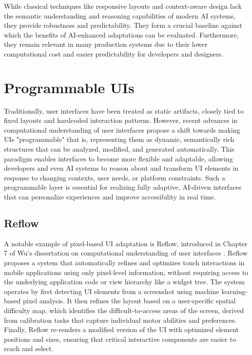 \documentclass[openany]{book}
\begin{document}
While classical techniques like responsive layouts and context-aware design lack the semantic understanding and reasoning capabilities of modern AI systems, they provide robustness and predictability. They form a crucial baseline against which the benefits of AI-enhanced adaptations can be evaluated. Furthermore, they remain relevant in many production systems due to their lower computational cost and easier predictability for developers and designers.

\section{Programmable UIs}
Traditionally, user interfaces have been treated as static artifacts, closely tied to fixed layouts and hardcoded interaction patterns. However, recent advances in computational understanding of user interfaces propose a shift towards making UIs "programmable" that is, representing them as dynamic, semantically rich structures that can be analyzed, modified, and generated automatically. This paradigm enables interfaces to become more flexible and adaptable, allowing developers and even AI systems to reason about and transform UI elements in response to changing contexts, user needs, or platform constraints. Such a programmable layer is essential for realizing fully adaptive, AI-driven interfaces that can personalize experiences and improve accessibility in real time.

\subsection{Reflow}
 
A notable example of pixel-based UI adaptation is Reflow, introduced in Chapter 7 of Wu's dissertation on computational understanding of user interfaces \cite{Wu2024}. Reflow proposes a system that automatically refines and optimizes touch interactions in mobile applications using only pixel-level information, without requiring access to the underlying application code or view hierarchy like a widget tree.
The system operates by first detecting UI elements from a screenshot using machine learning-based pixel analysis. It then refines the layout based on a user-specific spatial difficulty map, which identifies the difficult-to-access areas of the screen, derived from calibration tasks that capture individual motor abilities and preferences. Finally, Reflow re-renders a modified version of the UI with optimized element positions and sizes, ensuring that critical interactive components are easier to reach and select.
\end{document}
